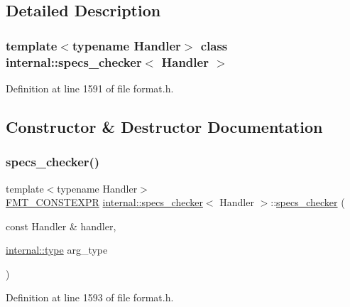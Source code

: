 \subsection{Detailed Description}
\subsubsection*{template$<$typename Handler$>$\newline
class internal\+::specs\+\_\+checker$<$ Handler $>$}



Definition at line 1591 of file format.\+h.



\subsection{Constructor \& Destructor Documentation}
\mbox{\label{classinternal_1_1specs__checker_afe7e3d3c7f0acc86ba7febff36b44a83}} 
\subsubsection{\texorpdfstring{specs\+\_\+checker()}{specs\_checker()}\hspace{0.1cm}{\footnotesize\ttfamily [1/2]}}
{\footnotesize\ttfamily template$<$typename Handler$>$ \\
\hyperlink{core_8h_a69201cb276383873487bf68b4ef8b4cd}{F\+M\+T\+\_\+\+C\+O\+N\+S\+T\+E\+X\+PR} \hyperlink{classinternal_1_1specs__checker}{internal\+::specs\+\_\+checker}$<$ Handler $>$\+::\hyperlink{classinternal_1_1specs__checker}{specs\+\_\+checker} (\begin{DoxyParamCaption}\item[{const Handler \&}]{handler,  }\item[{\hyperlink{namespaceinternal_a8661864098ac0acff9a6dd7e66f59038}{internal\+::type}}]{arg\+\_\+type }\end{DoxyParamCaption})\hspace{0.3cm}{\ttfamily [inline]}}



Definition at line 1593 of file format.\+h.

\mbox{\label{classinternal_1_1specs__checker_a0d84f57d4674c774d5c7ac8c45eb5bab}} 
